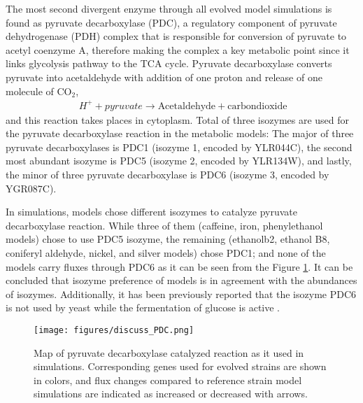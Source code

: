 The most second divergent enzyme through all evolved model simulations is found as pyruvate decarboxylase (PDC), a regulatory component of pyruvate dehydrogenase (PDH) complex that is responsible for conversion of pyruvate to acetyl coenzyme A, therefore making the complex a key metabolic point since it links glycolysis pathway to the TCA cycle. Pyruvate decarboxylase converts pyruvate into acetaldehyde with addition of one proton and release of one molecule of CO$_2$,
\begin{align}
\label{eq:pyrdec}
\ H^+ + pyruvate \rightarrow \text{Acetaldehyde} + \text{carbondioxide}
\end{align}
and this reaction takes places in cytoplasm. Total of three isozymes are used for the pyruvate decarboxylase reaction in the metabolic models: The major of three pyruvate decarboxylases is PDC1 (isozyme 1, encoded by YLR044C), the second most abundant isozyme is PDC5 (isozyme 2, encoded by YLR134W), and lastly, the minor of three pyruvate decarboxylase is PDC6 (isozyme 3, encoded by YGR087C).

In simulations, models chose different isozymes to catalyze pyruvate decarboxylase reaction. While three of them (caffeine,  iron,  phenylethanol models) chose to use PDC5 isozyme, the remaining (ethanolb2, ethanol B8, coniferyl aldehyde, nickel, and silver models) chose PDC1; and none of the models carry fluxes through PDC6 as it can be seen from the Figure \ref{fig:discuss_PDC}. It can be concluded that isozyme preference of models is in agreement with the abundances of isozymes. Additionally, it has been previously reported that the isozyme PDC6 is not used by yeast while the fermentation of glucose is active \cite{hohmann1991pdc6}.

\vspace{0.5cm}
\begin{figure}[H]
\texttt{[image: figures/discuss\_PDC.png]}
\caption[Map of pyruvate decarboxylase catalyzed reaction as it used in simulations]{Map of pyruvate decarboxylase catalyzed reaction as it used in simulations. Corresponding genes used for evolved strains are shown in colors, and flux changes compared to reference strain model simulations are indicated as increased or decreased with arrows.}
\label{fig:discuss_PDC}
\end{figure}

\vspace{-0.5cm}

